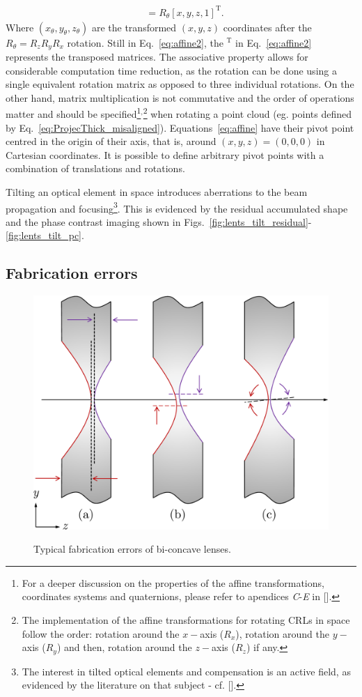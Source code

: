 \begin{refsection}
\begin{align}
     & = R_\theta[x,y,z,1]^\text{T}.
\end{align}{}
Where $(x_\theta,y_\theta,z_\theta)$ are the transformed $(x,y,z)$ coordinates after the $R_{\theta}=R_zR_yR_x$ rotation. Still in Eq.~\ref{eq:affine2}, the $^\text{T}$ in Eq.~\ref{eq:affine2} represents the transposed matrices. The associative property allows for considerable computation time reduction, as the rotation can be done using a single equivalent rotation matrix as opposed to three individual rotations. On the other hand, matrix multiplication is not commutative and the order of operations matter and should be specified\footnote{For a deeper discussion on the properties of the affine transformations, coordinates systems and quaternions, please refer to apendices \textit{C}-\textit{E} in [\cite{House2016}].}$^{,}$\footnote{The implementation of the affine transformations for rotating CRLs in space follow the order: rotation around the $x-$axis ($R_x$), rotation around the $y-$axis ($R_y$) and then, rotation around the $z-$axis ($R_z$) if any.} when rotating a point cloud (eg. points defined by Eq.~\ref{eq:ProjecThick_misaligned}). Equations~\ref{eq:affine} have their pivot point centred in the origin of their axis, that is, around $(x,y,z)=(0,0,0)$ in Cartesian coordinates. It is possible to define arbitrary pivot points with a combination of translations and rotations. 

Tilting an optical element in space introduces aberrations to the beam propagation and focusing\footnote{The interest in tilted optical elements and compensation is an active field, as evidenced by the literature on that subject - cf. [\cite{Guizar-Sicairos2011,Zhou2019,Ali2020}].}. This is evidenced by the residual accumulated shape and the phase contrast imaging shown in Figs.~\ref{fig:lents_tilt_residual}-\ref{fig:lents_tilt_pc}.

\subsection{Fabrication errors}

\begin{figure}[t]
    \centering
    {\includegraphics[width=0.4\linewidth]{figures/ch04/manufacturing.pdf}}
    \caption[Typical fabrication errors of bi-concave lenses]{Typical fabrication errors of bi-concave lenses. }
    \label{fig:manufacturing}
\end{figure}


\end{refsection}
